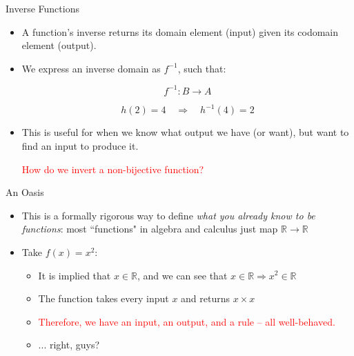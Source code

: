 \documentclass[10pt]{beamer}
\begin{document}
\begin{frame}{Inverse Functions}

\begin{itemize}
        \item A function's inverse returns its domain element (input) given its codomain element (output).

        \item We express an inverse domain as $f^{-1}$, such that:

        \[f^{-1}:B \rightarrow A\]

        \[h(2) = 4 \quad \Rightarrow  \quad h^{-1}(4)=2\]

        \item This is useful for when we know what output we have (or want), but want to find an input to produce it. \\

        \vspace{.5cm}

        \textcolor{red}{How do we invert a non-bijective function?}
\end{itemize}

\end{frame}

\begin{frame}{An Oasis}

\begin{itemize}
    \item This is a formally rigorous way to define \textit{what you already know to be functions}: most ``functions" in algebra and calculus just map $\mathbb{R} \rightarrow \mathbb{R}$

    \item Take $f(x) = x^2$:

    \begin{itemize}
        \item It is implied that $x \in \mathbb{R}$, and we can see that $x \in \mathbb{R} \Rightarrow x^2 \in \mathbb{R}$ \pause
        \item The function takes every input $x$ and returns $x \times x$ \pause
        \item \textcolor{red}{Therefore, we have an input, an output, and a rule -- all well-behaved.}
        \pause
        \item ... right, guys?
    \end{itemize}
\end{itemize}


\end{frame}
\end{document}
